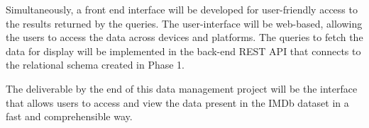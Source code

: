 \documentclass{sig-alternate}
\begin{document}
Simultaneously, a front end interface will be developed for user-friendly access to the results returned by the queries. The user-interface will be web-based, allowing the users to access the data across devices and platforms. The queries to fetch the data for display will be implemented in the back-end REST API that connects to the relational schema created in Phase 1.

The deliverable by the end of this data management project will be the interface that allows users to access and view the data present in the IMDb dataset in a fast and comprehensible way. 
\end{document}
